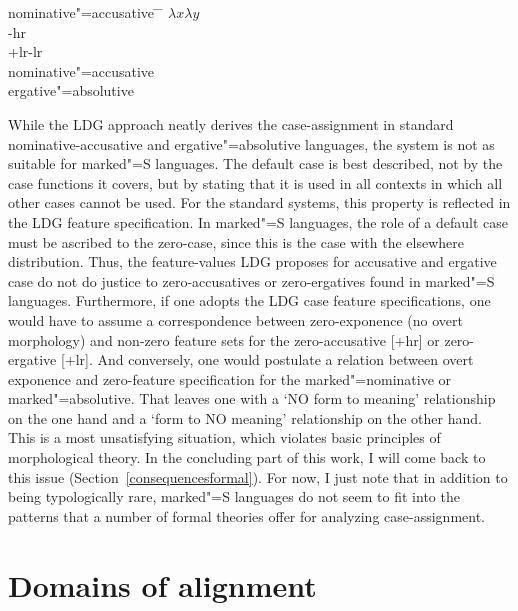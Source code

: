 \begin{exe}
\ex\label{LDGTS}
\begin{tabbing}
nominative"=accusative \quad \= \nom{} \quad \= \kill
{} \> $\lambda x$\>$\lambda y$\\
{}\> -hr \\
{}\> {+lr}\>-lr \\
nominative"=accusative\> \nom{} \>\acc{}	\\
ergative"=absolutive\> \erg{} \>\abs{} 
\end{tabbing}
\end{exe}

While the LDG approach neatly derives the case-assignment in standard no\-mi\-na\-tive-accusative and ergative"=absolutive languages, the system is not as suitable for marked"=S languages. 
The default case is best described, not by the case functions it covers, but by stating that it is used in all contexts in which all other cases cannot be used. 
For the standard systems, this property is reflected in the LDG feature specification.  
In marked"=S languages, the role of a default case must be ascribed to the zero-case, since this is the case with the elsewhere distribution. 
Thus, the feature-values LDG proposes for accusative and ergative case do not do justice to zero-accusatives or zero-ergatives found in marked"=S languages. 
Furthermore, if one adopts the LDG case feature specifications, one  would have to assume a correspondence between zero-exponence (no overt morphology) and non-zero feature sets for the zero-accusative [+hr] or zero-ergative [+lr]. 
And conversely, one would postulate a relation between overt exponence and zero-feature specification for the marked"=nominative or marked"=absolutive.  
That leaves one with a `NO form to meaning' relationship on the one hand and a `form to NO meaning' relationship on the other hand.
This is a most unsatisfying situation, which violates basic principles of morphological theory. 
In the concluding part of this work, I will come back to this issue (Section~\ref{consequencesformal}). 
For now, I just note that in addition to being typologically rare, marked"=S languages do not seem to fit into the patterns that a number of formal theories offer for analyzing case-assignment.


\section{Domains of alignment}\label{domains}


